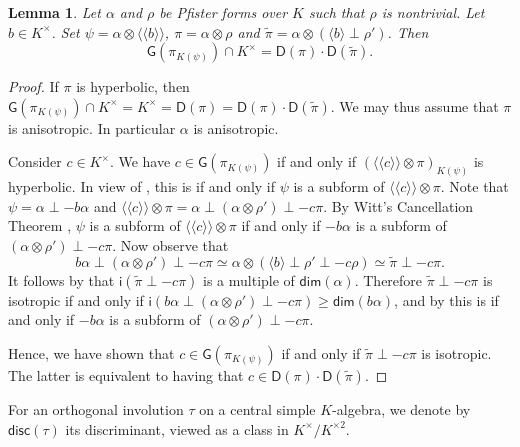 \documentclass[twoside,11pt]{amsart}
\numberwithin{equation}{section}
\newtheorem{lem}[equation]{Lemma}
\theoremstyle{definition}
\renewcommand{\dim}{\mathsf{dim}}
\newcommand{\mg}[1]{{#1}^{\times}}
\newcommand{\sq}[1]{{#1}^{\times 2}}
\newcommand{\scg}[1]{\mg{#1}/\sq{#1}}
\newcommand{\la}{\langle}
\newcommand{\ra}{\rangle}
\newcommand{\lla}{\la\!\la}
\newcommand{\rra}{\ra\!\ra}
\renewcommand{\geq}{\geqslant}
\newcommand{\disc}{\mathsf{disc}}
\newcommand{\G}{\mathsf{G}}
\newcommand{\D}{\mathsf{D}}
\newcommand{\wi}{\mathsf{i}}
\newcommand{\wt}{\widetilde}
\begin{document}
\begin{lem}\label{L:Pfister-fufi-G}
    Let $\alpha$ and $\rho$ be Pfister forms over $K$ such that $\rho$ is nontrivial. Let $b\in\mg{K}$. 
    Set $\psi=\alpha\otimes \lla b\rra$, $\pi=\alpha\otimes\rho$ and $\wt{\pi}=\alpha\otimes (\la b\ra\perp\rho')$.
    Then \[\G(\pi_{K(\psi)})\cap\mg{K}=\D(\pi)\cdot\D(\wt{\pi}).\]
\end{lem}
\begin{proof}
    If $\pi$ is hyperbolic, then $\G(\pi_{K(\psi)})\cap\mg{K}=\mg{K}=\D(\pi)=\D(\pi)\cdot\D(\wt{\pi})$.
    We may thus assume that $\pi$ is anisotropic. In particular $\alpha$ is anisotropic.
    
    Consider $c\in\mg{K}$.
    We have $c\in\G(\pi_{K(\psi)})$ if and only if $(\lla c\rra\otimes\pi)_{K(\psi)}$ is hyperbolic. 
    In view of , this is if and only if $\psi$ is a subform of $\lla c\rra\otimes\pi$.
    Note that $\psi=\alpha \perp -b\alpha$ and $\lla c\rra\otimes \pi =\alpha\perp (\alpha\otimes \rho') \perp - c\pi$.
    By Witt's Cancellation Theorem \cite[Theorem 8.4]{EKM08}, $\psi$ is a subform of $\lla c\rra\otimes\pi$ if and only if $-b\alpha$ is a subform of $(\alpha\otimes \rho') \perp - c\pi$. 
    Now observe that
    $$b\alpha\perp (\alpha\otimes \rho')\perp -c\pi\simeq \alpha\otimes (\la b\ra\perp\rho'\perp -c\rho) \simeq \wt{\pi}\perp-c\pi.$$     
    It follows by  that $\wi(\wt{\pi}\perp-c\pi)$ is a multiple of $\dim(\alpha)$.
    Therefore $\wt{\pi}\perp-c\pi$ is isotropic if and only if $\wi(b\alpha\perp (\alpha\otimes \rho')\perp -c\pi)\geq \dim(b\alpha)$, and by  this is if and only if $-b\alpha$ is a subform of $(\alpha\otimes \rho')\perp -c\pi$.
    
    Hence, we have shown that $c\in\G(\pi_{K(\psi)})$ if and only if $\wt{\pi}\perp-c\pi$ is isotropic. The latter is equivalent to having that $c\in\D(\pi)\cdot \D(\wt{\pi})$. 
\end{proof}

For an orthogonal involution $\tau$ on a central simple $K$-algebra, we denote by $\disc(\tau)$ its discriminant, viewed as a class in $\scg{K}$.
\end{document}
